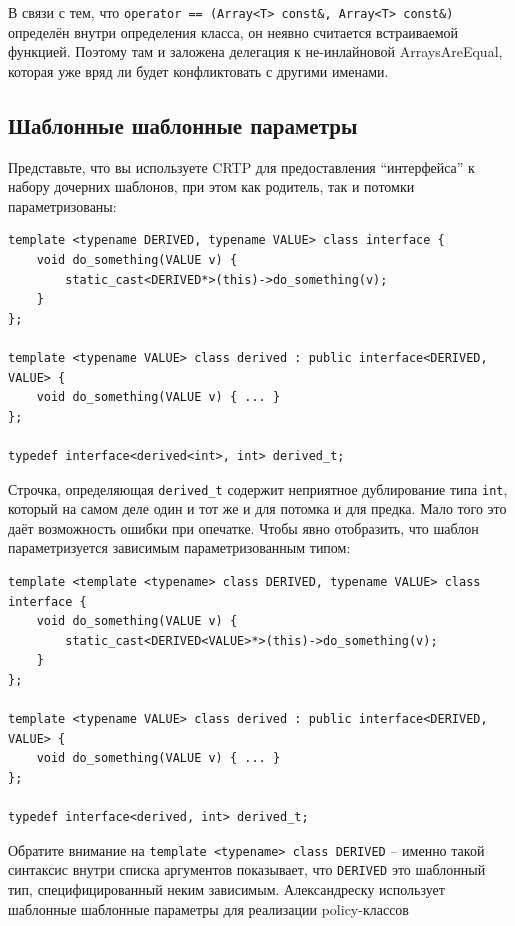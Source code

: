 \documentclass[a4paper,12pt,oneside]{article}
\begin{document}
В связи с тем, что \lstinline!operator == (Array<T> const&, Array<T> const&)! определён внутри определения класса, он неявно считается встраиваемой функцией. Поэтому там и заложена делегация к не-инлайновой ArraysAreEqual, которая уже вряд ли будет конфликтовать с другими именами.

\subsection{Шаблонные шаблонные параметры}

Представьте, что вы используете CRTP для предоставления ``интерфейса'' к набору дочерних шаблонов, при этом как родитель, так и потомки параметризованы:

\begin{lstlisting}
template <typename DERIVED, typename VALUE> class interface {
    void do_something(VALUE v) {
        static_cast<DERIVED*>(this)->do_something(v);
    }
};

template <typename VALUE> class derived : public interface<DERIVED, VALUE> {
    void do_something(VALUE v) { ... }
};

typedef interface<derived<int>, int> derived_t;
\end{lstlisting}

Строчка, определяющая \lstinline!derived_t! содержит неприятное дублирование типа  \lstinline!int!, который на самом деле один и тот же и для потомка и для предка. Мало того это даёт возможность ошибки при опечатке. Чтобы явно отобразить, что шаблон параметризуется зависимым параметризованным типом:

\begin{lstlisting}
template <template <typename> class DERIVED, typename VALUE> class interface {
    void do_something(VALUE v) {
        static_cast<DERIVED<VALUE>*>(this)->do_something(v);
    }
};

template <typename VALUE> class derived : public interface<DERIVED, VALUE> {
    void do_something(VALUE v) { ... }
};

typedef interface<derived, int> derived_t;
\end{lstlisting}

Обратите внимание на \lstinline!template <typename> class DERIVED! -- именно такой синтаксис внутри списка аргументов показывает, что \lstinline!DERIVED! это шаблонный тип, специфицированный неким зависимым. Александреску\cite{mcpp} использует шаблонные шаблонные параметры для реализации policy-классов
\end{document}
